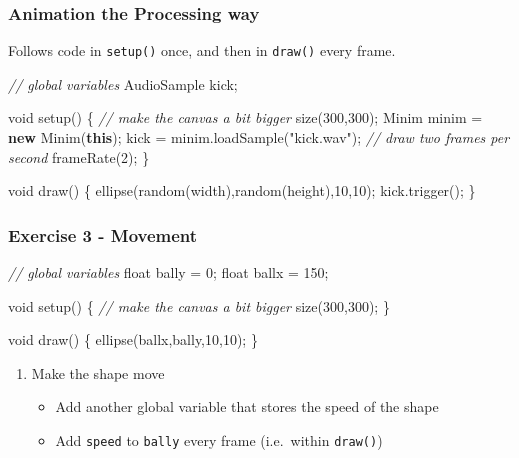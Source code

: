 \documentclass[ignorenonframetext,]{beamer}
\newenvironment{Shaded}{}{}
\newcommand{\KeywordTok}[1]{\textcolor[rgb]{0.00,0.44,0.13}{\textbf{{#1}}}}
\newcommand{\DataTypeTok}[1]{\textcolor[rgb]{0.56,0.13,0.00}{{#1}}}
\newcommand{\DecValTok}[1]{\textcolor[rgb]{0.25,0.63,0.44}{{#1}}}
\newcommand{\StringTok}[1]{\textcolor[rgb]{0.25,0.44,0.63}{{#1}}}
\newcommand{\CommentTok}[1]{\textcolor[rgb]{0.38,0.63,0.69}{\textit{{#1}}}}
\newcommand{\FunctionTok}[1]{\textcolor[rgb]{0.02,0.16,0.49}{{#1}}}
\newcommand{\NormalTok}[1]{{#1}}
\begin{document}
\begin{frame}[fragile]\frametitle{Animation the Processing way}

Follows code in \texttt{setup()} once, and then in \texttt{draw()} every
frame.

\begin{Shaded}
\begin{Highlighting}[]
\CommentTok{// global variables}
\NormalTok{AudioSample kick;}

\DataTypeTok{void} \FunctionTok{setup}\NormalTok{() \{}
  \CommentTok{// make the canvas a bit bigger}
  \FunctionTok{size}\NormalTok{(}\DecValTok{300}\NormalTok{,}\DecValTok{300}\NormalTok{);}
  \NormalTok{Minim minim = }\KeywordTok{new} \FunctionTok{Minim}\NormalTok{(}\KeywordTok{this}\NormalTok{);}
  \NormalTok{kick = minim.}\FunctionTok{loadSample}\NormalTok{(}\StringTok{"kick.wav"}\NormalTok{);}
  \CommentTok{// draw two frames per second}
  \FunctionTok{frameRate}\NormalTok{(}\DecValTok{2}\NormalTok{);}
\NormalTok{\}}

\DataTypeTok{void} \FunctionTok{draw}\NormalTok{() \{}
  \FunctionTok{ellipse}\NormalTok{(}\FunctionTok{random}\NormalTok{(width),}\FunctionTok{random}\NormalTok{(height),}\DecValTok{10}\NormalTok{,}\DecValTok{10}\NormalTok{);}
  \NormalTok{kick.}\FunctionTok{trigger}\NormalTok{();}
\NormalTok{\}}
\end{Highlighting}
\end{Shaded}

\end{frame}

\begin{frame}[fragile]\frametitle{Exercise 3 - Movement}

\begin{Shaded}
\begin{Highlighting}[]
\CommentTok{// global variables}
\DataTypeTok{float} \NormalTok{bally = }\DecValTok{0}\NormalTok{;}
\DataTypeTok{float} \NormalTok{ballx = }\DecValTok{150}\NormalTok{;}

\DataTypeTok{void} \FunctionTok{setup}\NormalTok{() \{}
  \CommentTok{// make the canvas a bit bigger}
  \FunctionTok{size}\NormalTok{(}\DecValTok{300}\NormalTok{,}\DecValTok{300}\NormalTok{);}
\NormalTok{\}}

\DataTypeTok{void} \FunctionTok{draw}\NormalTok{() \{}
  \FunctionTok{ellipse}\NormalTok{(ballx,bally,}\DecValTok{10}\NormalTok{,}\DecValTok{10}\NormalTok{);}
\NormalTok{\}}
\end{Highlighting}
\end{Shaded}

\begin{enumerate}[1.]
\item
  Make the shape move

  \begin{itemize}
  \item
    Add another global variable that stores the speed of the shape
  \item
    Add \texttt{speed} to \texttt{bally} every frame (i.e.~within
    \texttt{draw()})
  \end{itemize}
\end{enumerate}

\end{frame}
\end{document}
